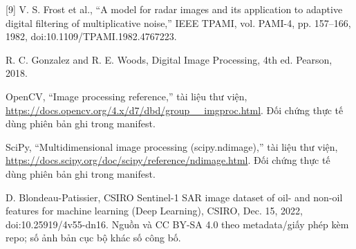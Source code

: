 \documentclass[12pt,a4paper]{extreport}
\begin{document}
[9] V. S. Frost et al.,\allowbreak{} “A model for radar images and its application to adaptive digital filtering of multiplicative noise,\allowbreak{}” IEEE TPAMI,\allowbreak{} vol. PAMI-4,\allowbreak{} pp. 157–166,\allowbreak{} 1982,\allowbreak{} doi:10.1109/\allowbreak{}TPAMI.1982.4767223.
\par
[10] R. C. Gonzalez and R. E. Woods,\allowbreak{} Digital Image Processing,\allowbreak{} 4th ed. Pearson,\allowbreak{} 2018.
\par
[11] OpenCV,\allowbreak{} “Image processing reference,\allowbreak{}” tài liệu thư viện,\allowbreak{} \url{https://docs.opencv.org/4.x/d7/dbd/group__imgproc.html}. Đối chứng thực tế dùng phiên bản ghi trong manifest.
\par
[12] SciPy,\allowbreak{} “Multidimensional image processing (scipy.ndimage),\allowbreak{}” tài liệu thư viện,\allowbreak{} \url{https://docs.scipy.org/doc/scipy/reference/ndimage.html}. Đối chứng thực tế dùng phiên bản ghi trong manifest.
\par
[13] D. Blondeau-Patissier,\allowbreak{} CSIRO Sentinel-1 SAR image dataset of oil- and non-oil features for machine learning (Deep Learning),\allowbreak{} CSIRO,\allowbreak{} Dec. 15,\allowbreak{} 2022,\allowbreak{} doi:10.25919/\allowbreak{}4v55-dn16. Nguồn và CC BY-SA 4.0 theo metadata/\allowbreak{}giấy phép kèm repo; số ảnh bản cục bộ khác số công bố.
\par
\end{document}

